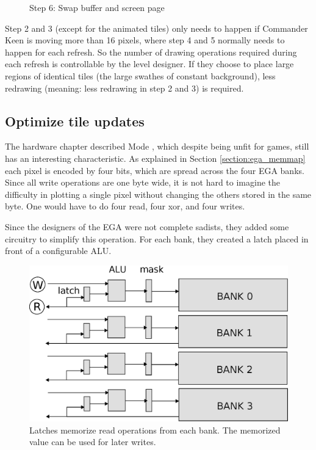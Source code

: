 \documentclass[book.tex]{subfiles}
\begin{document}
\begin{figure}[H]
\centering
 \caption{Step 6: Swap buffer and screen page}
 \label{fig:kc1_3_update_final}
\end{figure}

Step 2 and 3 (except for the animated tiles) only needs to happen if Commander Keen is moving more than 16 pixels, where step 4 and 5 normally needs to happen for each refresh.
So the number of drawing operations required during each refresh is controllable by the level designer. If they choose to place large regions of identical tiles (the large swathes of constant background), less redrawing (meaning: less redrawing in step 2 and 3) is required.

\pagebreak

\subsection{Optimize tile updates}
\label{section:optimize_tile}
The hardware chapter described Mode , which despite being unfit for games, still has an interesting characteristic. As explained in Section \ref{section:ega_memmap} each pixel is encoded by four bits, which are spread across the four EGA banks. Since all write operations are one byte wide, it is not hard to imagine the difficulty in plotting a single pixel without changing the others stored in the same byte. One would have to do four read, four xor, and four writes.\\
\par
 Since the designers of the EGA were not complete sadists, they added some circuitry to simplify this operation. For each bank, they created a latch placed in front of a configurable ALU.\\
\par
 \begin{figure}[H]
\centering
 \includegraphics[width=\textwidth]{imgs/drawings/latches.eps}
 \caption{Latches memorize read operations from each bank. The memorized value can be used for later writes.}
 \end{figure}
\end{document}
